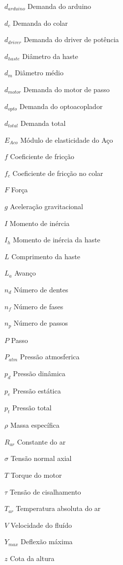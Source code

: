 \begin{simbolos} \itemsep -1pt
	\item[$d_{arduino}$] Demanda do arduino
	\item[$d_{c}$] Demanda do colar
	\item[$d_{driver}$] Demanda do driver de potência
	\item[$d_{haste}$] Diâmetro da haste 
	\item[$d_{m}$] Diâmetro médio
	\item[$d_{motor}$] Demanda do motor de passo
	\item[$d_{opto}$] Demanda do optoacoplador
	\item[$d_{total}$] Demanda total
	\item[$E_{Aco}$] Módulo de elasticidade do Aço
	\item[$f$] Coeficiente de fricção
	\item[$f_{c}$] Coeficiente de fricção no colar
	\item[$F$] Força
	\item[$g$] Aceleração gravitacional
	\item[$I$] Momento de inércia 
	\item[$I_{h}$] Momento de inércia da haste 
	\item[$L$] Comprimento da haste 
	\item[$L_{a}$] Avanço 
	\item[$n_{d}$] Número de dentes
	\item[$n_{f}$] Número de fases
	\item[$n_{p}$] Número de passos
	\item[$P$] Passo
	\item[$P_{atm}$] Pressão atmosferica
	\item[$p_{d}$] Pressão dinâmica
	\item[$p_{e}$] Pressão estática
	\item[$p_{t}$] Pressão total
	\item[$\rho$] Massa específica
	\item[$R_{ar}$] Constante do ar
	\item[$\sigma$] Tensão normal axial
	\item[$T$] Torque do motor
	\item[$\tau$] Tensão de cisalhamento
	\item[$T_{ar}$] Temperatura absoluta do ar
	\item[$V$] Velocidade do fluído
	\item[$Y_{max}$] Deflexão máxima 
	\item[$z$] Cota da altura
\end{simbolos}